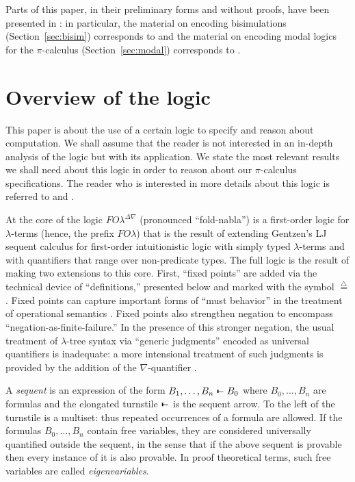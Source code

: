 \documentclass{acmtrans2m}
\def\relbar{\mathrel{\smash-}}
\def\joinrelm{\mathrel{\mkern-3.2mu}}
\def\tailpiece{\kern 1pt\vrule height 1ex width 0.3ex depth -.25ex}
\def\seqsym{\mathrel{\tailpiece\joinrelm\relbar}}
\newcommand{\FOL   }{FO\lambda}
\newcommand{\FOLDNb}{\FOL^{\Delta\nabla}}
\newcommand{\Seq}[2]{#1\seqsym #2}
\newcommand{\defeq}{\mathrel{\stackrel{{\scriptscriptstyle\triangle}}{=}}}
\begin{document}
Parts of this paper, in their preliminary forms and without proofs,
have been presented in \cite{tiu04fguc,tiu05concur}: in particular,
the material on encoding bisimulations (Section~\ref{sec:bisim})
corresponds to \cite{tiu04fguc} and the material on encoding modal
logics for the $\pi$-calculus (Section~\ref{sec:modal}) corresponds to
\cite{tiu05concur}.



\section{Overview of the logic}
\label{sec:foldn}

This paper is about the use of a certain logic to specify and reason
about computation.  We shall assume that the reader is not interested
in an in-depth analysis of the logic but with its application.  We
state the most relevant results we shall need about this logic in
order to reason about our $\pi$-calculus specifications.  The reader
who is interested in more details about this logic is referred to
\cite{tiu04phd} and \cite{miller05tocl}.


At the core of the logic $\FOLDNb$ (pronounced ``fold-nabla'') is a
first-order logic for $\lambda$-terms (hence, the prefix $\FOL$) that
is the result of extending Gentzen's LJ sequent calculus for
first-order intuitionistic logic \cite{gentzen35} with simply typed
$\lambda$-terms and with quantifiers that range over non-predicate
types.
The full logic is the result of making two extensions to this core.
First, ``fixed points'' are added via the technical
device of ``definitions,'' presented below and marked with the symbol
$\defeq$.  Fixed points can capture important forms of ``must
behavior'' in the treatment of operational semantics
\cite{mcdowell00tcs,mcdowell03tcs}.  Fixed points also strengthen
negation to encompass ``negation-as-finite-failure.''  In the presence
of this stronger negation, the usual treatment of $\lambda$-tree
syntax via ``generic judgments'' encoded as universal quantifiers is inadequate:
a more intensional
treatment of such judgments is provided by the addition of the
$\nabla$-quantifier \cite{miller05tocl}.

A {\em sequent} is an expression of the form
$
\Seq{B_1, \dots, B_n}{B_0}
$
where $B_0,\ldots,B_n$ are formulas and the elongated turnstile
$\seqsym$ is the sequent arrow.
To the left of the turnstile is a multiset: thus
repeated occurrences of a formula are allowed.  If the formulas $B_0,
\dots, B_n$ contain free variables, they are considered universally
quantified outside the sequent, in the sense that if the above sequent
is provable then every instance of it is also provable.  In proof
theoretical terms, such free variables are called {\em eigenvariables}.
\end{document}

